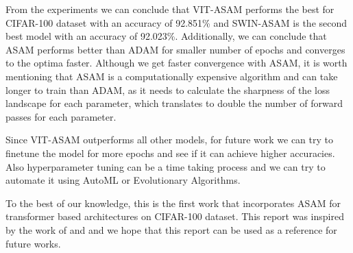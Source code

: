 \documentclass{article}
\begin{document}
From the experiments we can conclude that VIT-ASAM performs the best for CIFAR-100 dataset with an accuracy of 92.851\% and SWIN-ASAM is the second best model with an accuracy of 92.023\%.
Additionally, we can conclude that ASAM performs better than ADAM for smaller number of epochs and converges to the optima faster.
Although we get faster convergence with ASAM, it is worth mentioning that ASAM is a computationally expensive algorithm and can take longer to train than ADAM, as it needs to calculate the sharpness of the loss landscape for each parameter, which translates to double the number of forward passes for each parameter.

Since VIT-ASAM outperforms all other models, for future work we can try to finetune the model for more epochs and see if it can achieve higher accuracies.
Also hyperparameter tuning can be a time taking process and we can try to automate it using AutoML or Evolutionary Algorithms.

To the best of our knowledge, this is the first work that incorporates ASAM for transformer based architectures on CIFAR-100 dataset.
This report was inspired by the work of \cite{DBLP:journals/corr/abs-2102-11600} and \cite{DBLP:journals/corr/abs-2103-14030} and we hope that this report can be used as a reference for future works.


\nocite{*}




\end{document}

